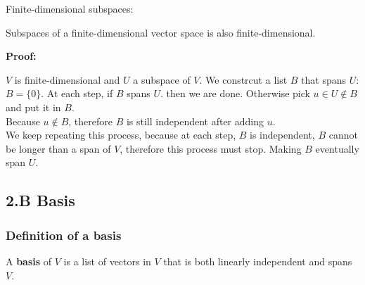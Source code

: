 \documentclass{article}
\begin{document}
Finite-dimensional subspaces:\\
\begin{addmargin}[1em]{0em}
    Subspaces of a finite-dimensional vector space is also finite-dimensional.\\
\end{addmargin}
\textbf{Proof:}\\
\begin{addmargin}[1em]{0em}
    $V$ is finite-dimensional and $U$ a subspace of $V$. We constrcut a list $B$ that spans $U$:\\
    $B = \{0\}$.
    At each step, if $B$ spans $U$. then we are done. Otherwise pick $u \in U \notin B$ and put it in $B$.\\
    Because $u \notin B$, therefore $B$ is still independent after adding $u$.\\
    We keep repeating this process, because at each step, $B$ is independent, $B$ cannot be longer than a span of $V$, therefore this process must stop. Making $B$ eventually span $U$.\\
\end{addmargin}
\subsection{2.B Basis}
\subsubsection{Definition of a basis}
\begin{addmargin}[1em]{0em}
    A \textbf{basis} of $V$ is a list of vectors in $V$ that is both linearly independent and spans $V$.
\end{addmargin}
\end{document}

